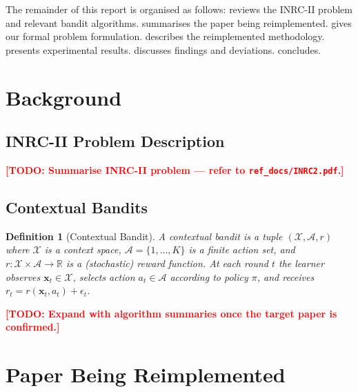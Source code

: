 \documentclass[12pt, a4paper]{article}
\newcommand{\xt}{\mathbf{x}_t}          %
\newcommand{\reward}{r_t}               %
\newcommand{\policy}{\pi}               %
\newcommand{\TODO}[1]{\textbf{\textcolor{red}{[TODO: #1]}}}
\newtheorem{definition}{Definition}[section]
\begin{document}
The remainder of this report is organised as follows:
 reviews the INRC-II problem and relevant bandit
algorithms.
 summarises the paper being reimplemented.
 gives our formal problem formulation.
 describes the reimplemented methodology.
 presents experimental results.
 discusses findings and deviations.
 concludes.

\section{Background}
\label{sec:background}

\subsection{INRC-II Problem Description}

\TODO{Summarise INRC-II problem — refer to \texttt{ref\_docs/INRC2.pdf}.}

\subsection{Contextual Bandits}

\begin{definition}[Contextual Bandit]
A contextual bandit is a tuple $(\mathcal{X}, \mathcal{A}, r)$ where
$\mathcal{X}$ is a context space, $\mathcal{A} = \{1, \ldots, K\}$ is a
finite action set, and $r : \mathcal{X} \times \mathcal{A} \to \mathbb{R}$
is a (stochastic) reward function.  At each round $t$ the learner observes
$\xt \in \mathcal{X}$, selects action $a_t \in \mathcal{A}$ according to
policy $\policy$, and receives $\reward = r(\xt, a_t) + \epsilon_t$.
\end{definition}

\TODO{Expand with algorithm summaries once the target paper is confirmed.}

\section{Paper Being Reimplemented}
\label{sec:paper}
\end{document}
